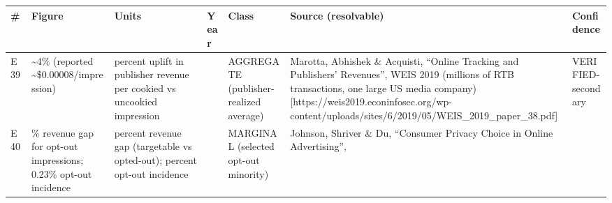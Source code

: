 \documentclass[
  11pt,
]{article}
\newcounter{none} %
\begin{document}
{\def\LTcaptype{none} %
\begin{longtable}[]{@{}
  >{\raggedright\arraybackslash}p{}
  >{\raggedright\arraybackslash}p{}
  >{\raggedright\arraybackslash}p{}
  >{\raggedright\arraybackslash}p{}
  >{\raggedright\arraybackslash}p{}
  >{\raggedright\arraybackslash}p{}
  >{\raggedright\arraybackslash}p{}@{}}
\toprule\noalign{}
\begin{minipage}[b]{\linewidth}\raggedright
\#
\end{minipage} & \begin{minipage}[b]{\linewidth}\raggedright
Figure
\end{minipage} & \begin{minipage}[b]{\linewidth}\raggedright
Units
\end{minipage} & \begin{minipage}[b]{\linewidth}\raggedright
Year
\end{minipage} & \begin{minipage}[b]{\linewidth}\raggedright
Class
\end{minipage} & \begin{minipage}[b]{\linewidth}\raggedright
Source (resolvable)
\end{minipage} & \begin{minipage}[b]{\linewidth}\raggedright
Confidence
\end{minipage} \\
\midrule\noalign{}
\endhead
\bottomrule\noalign{}
\endlastfoot
E39 & \textasciitilde4\% (reported \textasciitilde\$0.00008/impression)
& percent uplift in publisher revenue per cookied vs uncookied
impression & 2019 & AGGREGATE (publisher-realized average) & Marotta,
Abhishek \& Acquisti, ``Online Tracking and Publishers' Revenues'', WEIS
2019 (millions of RTB transactions, one large US media company)
{[}https://weis2019.econinfosec.org/wp-content/uploads/sites/6/2019/05/WEIS\_2019\_paper\_38.pdf{]}
& VERIFIED-secondary \\
E40 & 52\% revenue gap for opt-out impressions; 0.23\% opt-out incidence
& percent revenue gap (targetable vs opted-out); percent opt-out
incidence & 2020 & MARGINAL (selected opt-out minority) & Johnson,
Shriver \& Du, ``Consumer Privacy Choice in Online Advertising'',

\end{longtable}}
\end{document}
